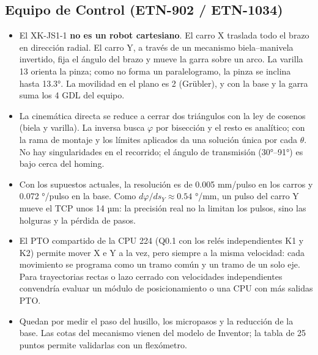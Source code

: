 \documentclass[a4paper,12pt]{article}
\begin{document}
\subsection{Equipo de Control (ETN-902 / ETN-1034)}
\begin{itemize}
\item El XK-JS1-1 \textbf{no es un robot cartesiano}. El carro X traslada todo el brazo en dirección radial.
      El carro Y, a través de un mecanismo biela--manivela invertido, fija el ángulo del brazo y mueve la
      garra sobre un arco. La varilla 13 orienta la pinza; como no forma un paralelogramo, la pinza se inclina hasta 13.3°. La movilidad en el plano es 2
      (Grübler), y con la base y la garra suma los 4 GDL del equipo.
\item La cinemática directa se reduce a cerrar dos triángulos con la ley de cosenos (biela y varilla). La inversa
      busca $\varphi$ por bisección y el resto es analítico; con la rama de montaje y los límites aplicados da una
      solución única por cada $\theta$. No hay singularidades en el recorrido; el ángulo de transmisión
      (30°--91°) es bajo cerca del homing.
\item Con los supuestos actuales, la resolución es de 0.005 mm/pulso en los carros y 0.072 °/pulso en la
      base. Como $d\varphi/ds_Y \approx 0.54$ °/mm, un pulso del carro Y mueve el TCP unos 14 µm: la
      precisión real no la limitan los pulsos, sino las holguras y la pérdida de pasos.
\item El PTO compartido de la CPU 224 (Q0.1 con los relés independientes K1 y K2) permite mover X e Y a la
      vez, pero siempre a la misma velocidad: cada movimiento se programa como un tramo común y un tramo
      de un solo eje. Para trayectorias rectas o lazo cerrado con velocidades independientes convendría
      evaluar un módulo de posicionamiento o una CPU con más salidas PTO.
\item Quedan por medir el paso del husillo, los micropasos y la reducción de la base. Las cotas del mecanismo
      vienen del modelo de Inventor; la tabla de 25 puntos permite validarlas con un flexómetro.
\end{itemize}
\end{document}
